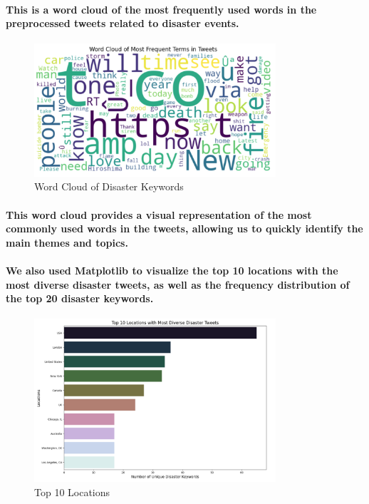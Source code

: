 \documentclass{article}
\begin{document}
\paragraph{This is a word cloud of the most frequently used words in the preprocessed tweets related to disaster events.}
\begin{figure}[h]
    \centering
    \includegraphics[width=0.8\textwidth]{wordcloud_tweets.png} 
    \caption{Word Cloud of Disaster Keywords}
    \label{fig:my_label}
\end{figure}
\paragraph{This word cloud provides a visual representation of the most commonly used words in the tweets, allowing us to quickly identify the main themes and topics.}
\paragraph{We also used Matplotlib to visualize the top 10 locations with the most diverse disaster tweets, as well as the frequency distribution of the top 20 disaster keywords.}
\begin{figure}[h]
    \centering
    \includegraphics[width=0.8\textwidth]{top_10_locations.png}
    \caption{Top 10 Locations}
    \label{fig:my_label}
\end{figure}
\end{document}
